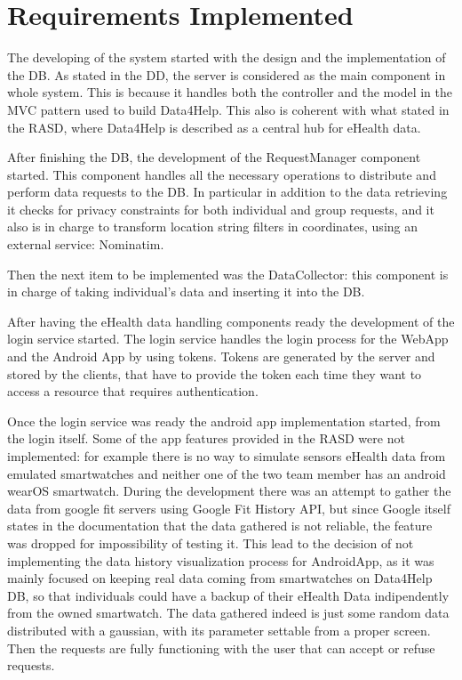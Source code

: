 \section{Requirements Implemented}

The developing of the system started with the design and  the implementation of the DB. As stated in the DD, the server is considered as the main component in whole system. This is because it handles both the controller and the model in the MVC pattern used to build Data4Help.
This also is coherent with what stated in the RASD, where Data4Help is described as a central hub for eHealth data.
\vspace{1em}

\noindent
After finishing the DB, the development of the RequestManager component started. This component handles all the necessary operations to distribute and perform data requests to the DB. In particular in addition to the data retrieving it checks for privacy constraints for both individual and group requests, and it also is in charge to transform location string filters in coordinates, using an external service: Nominatim.
\vspace{1em}

\noindent
Then the next item to be implemented was the DataCollector: this component is in charge of taking individual's data and inserting it into the DB.
\vspace{1em}

\noindent
After having the eHealth data handling components ready the development of the login service started. The login service handles the login process for the WebApp and the Android App by using tokens. Tokens are generated by the server and stored by the clients, that have to provide the token each time they want to access a resource that requires authentication.
\vspace{1em}

\noindent
Once the login service was ready the android app implementation started, from the login itself. 
Some of the app features provided in the RASD were not implemented: for example there is no way to simulate sensors eHealth data from emulated smartwatches and neither one of the two team member has an android wearOS smartwatch. During the development there was an attempt to gather the data from google fit servers using Google Fit History API, but since Google itself states in the documentation that the data gathered is not reliable, the feature was dropped for impossibility of testing it. This lead to the decision of not implementing the data history visualization process for AndroidApp, as it was mainly focused on keeping real data coming from smartwatches on Data4Help DB, so that individuals could have a backup of their eHealth Data indipendently from the owned smartwatch.
The data gathered indeed is just some random data distributed with a gaussian, with its parameter settable from a proper screen.
Then the requests are fully functioning with the user that can accept or refuse requests.
\vspace{1em}

